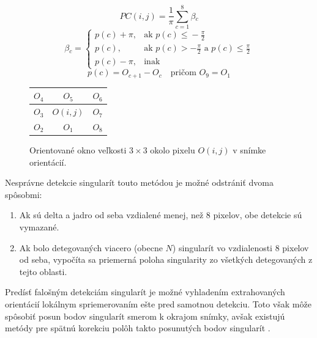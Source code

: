   \begin{equation}
    PC(i,j) = \frac{1}{\pi{}} \sum_{c=1}^{8}{\beta{}_c}
    \label{eq:poincare_1}
  \end{equation}
  \begin{equation}
    \beta{}_c = 
    \begin{cases}
      p(c) + \pi{},  & \text{ak } p(c) \leq{} - \frac{\pi{}}{2} \\
      p(c),          & \text{ak } p(c) >  - \frac{\pi{}}{2} \text{ a } p(c) \leq{} \frac{\pi{}}{2} \\
      p(c) - \pi{},  & \text{inak}
    \end{cases}
    \label{eq:poincare_2}
  \end{equation}
  \begin{equation}
    p(c) = O_{c+1} - O_c \quad \text{pričom } O_9 = O_1
    \label{eq:poincare_3}
  \end{equation}

  \begin{figure}[h]
    \centering
      \begin{tabular}{ | l | c | r | }
        \hline
        $O_4$ & $O_5$ & $O_6$ \\ \hline
        $O_3$ & $O(i,j)$ & $O_7$ \\ \hline
        $O_2$ & $O_1$ & $O_8$ \\
        \hline
      \end{tabular}
    \caption{Orientované okno veľkosti $3\times{}3$ okolo pixelu $O(i,j)$ v snímke orientácií.}
    \label{obr:okno_orientacie}
  \end{figure}
  
  Nesprávne detekcie singularít touto metódou je možné odstrániť dvoma spôsobmi:
  \begin{enumerate}
    \item Ak sú delta a jadro od seba vzdialené menej, než 8 pixelov, obe detekcie sú vymazané.
    \item Ak bolo detegovaných viacero (obecne $N$) singularít vo vzdialenosti 8 pixelov od seba, vypočíta sa priemerná poloha singularity zo všetkých
          detegovaných z tejto oblasti.
  \end{enumerate}
  Predísť falošným detekciám singularít je možné vyhladením extrahovaných orientácií lokálnym spriemerovaním ešte pred samotnou detekciu. Toto však môže
  spôsobiť posun bodov singularít smerom k okrajom snímky, avšak existujú metódy pre spätnú korekciu polôh takto posunutých bodov singularít \cite{Handbook}.

